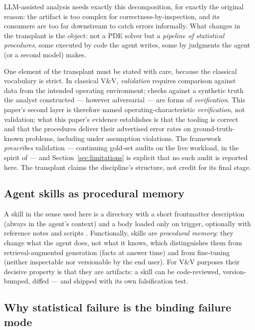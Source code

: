 \documentclass[11pt,a4paper]{article}
\begin{document}
LLM-assisted analysis needs exactly this decomposition, for exactly the
original reason: the artifact is too complex for correctness-by-inspection,
and its consumers are too far downstream to catch errors informally. What
changes in the transplant is the object: not a PDE solver but a
\emph{pipeline of statistical procedures}, some executed by code the agent
writes, some by judgments the agent (or a second model) makes.

One element of the transplant must be stated with care, because the
classical vocabulary is strict. In classical V\&V, \emph{validation}
requires comparison against data from the intended operating environment;
checks against a synthetic truth the analyst constructed --- however
adversarial --- are forms of \emph{verification}. This paper's second
layer is therefore named operating-characteristic \emph{verification},
not validation; what this paper's evidence establishes is that the tooling
is correct and that the procedures deliver their advertised error rates on
ground-truth-known problems, including under assumption violations. The
framework \emph{prescribes} validation --- continuing gold-set audits on
the live workload, in the spirit of \citet{sargent2013} --- and
Section~\ref{sec:limitations} is explicit that no such audit is reported
here. The transplant claims the discipline's structure, not credit for
its final stage.

\subsection{Agent skills as procedural memory}

A skill in the sense used here is a directory with a short frontmatter
description (always in the agent's context) and a body loaded only on
trigger, optionally with reference notes and scripts
\citep{anthropic2025skills}. Functionally, skills are \emph{procedural
memory}: they change what the agent does, not what it knows, which
distinguishes them from retrieval-augmented generation (facts at answer
time) \citep{lewis2020} and from fine-tuning (neither inspectable nor
versionable by the end user). For V\&V purposes their decisive property is
that they are artifacts: a skill can be code-reviewed, version-bumped,
diffed --- and shipped with its own falsification test.

\subsection{Why statistical failure is the binding failure mode}
\end{document}
